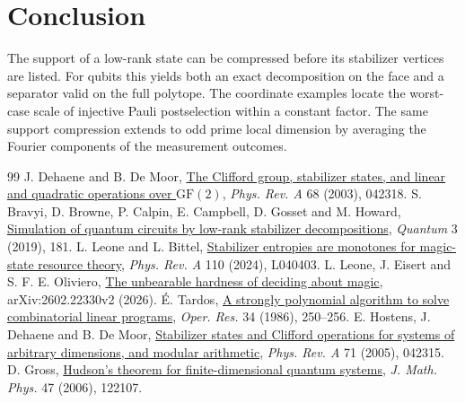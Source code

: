 \documentclass[11pt,letterpaper]{article}
\theoremstyle{definition}
\numberwithin{equation}{section}
\begin{document}
\section{Conclusion}
The support of a low-rank state can be compressed before its stabilizer vertices are listed. For qubits this yields both an exact decomposition on the face and a separator valid on the full polytope. The coordinate examples locate the worst-case scale of injective Pauli postselection within a constant factor. The same support compression extends to odd prime local dimension by averaging the Fourier components of the measurement outcomes.
\begingroup\small
\begin{thebibliography}{99}
 J. Dehaene and B. De Moor, \href{https://arxiv.org/abs/quant-ph/0304125}{The Clifford group, stabilizer states, and linear and quadratic operations over \(\mathrm{GF}(2)\)}, \emph{Phys. Rev. A} 68 (2003), 042318.
 S. Bravyi, D. Browne, P. Calpin, E. Campbell, D. Gosset and M. Howard, \href{https://arxiv.org/abs/1808.00128}{Simulation of quantum circuits by low-rank stabilizer decompositions}, \emph{Quantum} 3 (2019), 181.
 L. Leone and L. Bittel, \href{https://arxiv.org/abs/2404.11652}{Stabilizer entropies are monotones for magic-state resource theory}, \emph{Phys. Rev. A} 110 (2024), L040403.
 L. Leone, J. Eisert and S. F. E. Oliviero, \href{https://arxiv.org/abs/2602.22330v2}{The unbearable hardness of deciding about magic}, arXiv:2602.22330v2 (2026).
 \'E. Tardos, \href{https://doi.org/10.1287/opre.34.2.250}{A strongly polynomial algorithm to solve combinatorial linear programs}, \emph{Oper. Res.} 34 (1986), 250--256.
 E. Hostens, J. Dehaene and B. De Moor, \href{https://arxiv.org/abs/quant-ph/0408190}{Stabilizer states and Clifford operations for systems of arbitrary dimensions, and modular arithmetic}, \emph{Phys. Rev. A} 71 (2005), 042315.
 D. Gross, \href{https://arxiv.org/abs/quant-ph/0602001}{Hudson's theorem for finite-dimensional quantum systems}, \emph{J. Math. Phys.} 47 (2006), 122107.
\end{thebibliography}
\endgroup
\end{document}
